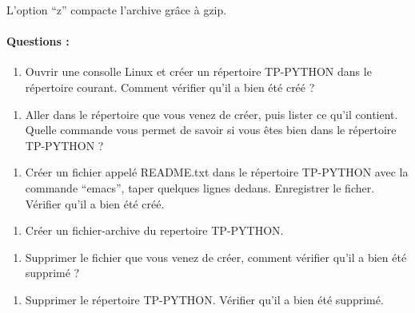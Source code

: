 \documentclass{article}
\begin{document}
L'option ``z'' compacte l'archive grâce à gzip.

    \paragraph{Questions :}\label{questions}

    \begin{enumerate}
\def\labelenumi{\arabic{enumi})}
\itemsep1pt\parskip0pt
\item
  Ouvrir une consolle Linux et créer un répertoire TP-PYTHON dans le
  répertoire courant. Comment vérifier qu'il a bien été créé ?
\end{enumerate}

    \begin{enumerate}
\def\labelenumi{\arabic{enumi})}
\setcounter{enumi}{1}
\itemsep1pt\parskip0pt
\item
  Aller dans le répertoire que vous venez de créer, puis lister ce qu'il
  contient. Quelle commande vous permet de savoir si vous êtes bien dans
  le répertoire TP-PYTHON ?
\end{enumerate}

    \begin{enumerate}
\def\labelenumi{\arabic{enumi})}
\setcounter{enumi}{2}
\itemsep1pt\parskip0pt
\item
  Créer un fichier appelé README.txt dans le répertoire TP-PYTHON avec
  la commande ``emacs'', taper quelques lignes dedans. Enregistrer le
  ficher. Vérifier qu'il a bien été créé.
\end{enumerate}

    \begin{enumerate}
\def\labelenumi{\arabic{enumi})}
\setcounter{enumi}{3}
\itemsep1pt\parskip0pt
\item
  Créer un fichier-archive du repertoire TP-PYTHON.
\end{enumerate}

    \begin{enumerate}
\def\labelenumi{\arabic{enumi})}
\setcounter{enumi}{4}
\itemsep1pt\parskip0pt
\item
  Supprimer le fichier que vous venez de créer, comment vérifier qu'il a
  bien été supprimé ?
\end{enumerate}

    \begin{enumerate}
\def\labelenumi{\arabic{enumi})}
\setcounter{enumi}{5}
\itemsep1pt\parskip0pt
\item
  Supprimer le répertoire TP-PYTHON. Vérifier qu'il a bien été supprimé.
\end{enumerate}
\end{document}
